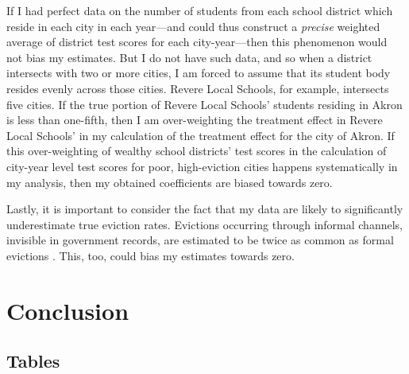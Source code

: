 \documentclass[12pt]{article}
\begin{document}
If I had perfect data on the number of students from each school district which reside in each city in each year—and could thus construct a \textit{precise} weighted average of district test scores for each city-year—then this phenomenon would not bias my estimates. But I do not have such data, and so when a district intersects with two or more cities, I am forced to assume that its student body resides evenly across those cities. Revere Local Schools, for example, intersects five cities. If the true portion of Revere Local Schools' students residing in Akron is less than one-fifth, then I am over-weighting the treatment effect in Revere Local Schools' in my calculation of the treatment effect for the city of Akron. If this over-weighting of wealthy school districts' test scores in the calculation of city-year level test scores for poor, high-eviction cities happens systematically in my analysis, then my obtained coefficients are biased towards zero.


Lastly, it is important to consider the fact that my data are likely to significantly underestimate true eviction rates. Evictions occurring through informal channels, invisible in government records, are estimated to be twice as common as formal evictions \citep{desmond_forced_2015}. This, too, could bias my estimates towards zero.

\section{Conclusion} \label{sec:conclusion}



\singlespacing
\setlength\bibsep{0pt}





\clearpage

\onehalfspacing


\begin{landscape}
\section*{Tables} \label{sec:tab}

\end{landscape}




\newpage
\begin{landscape}

\end{landscape}
\end{document}
